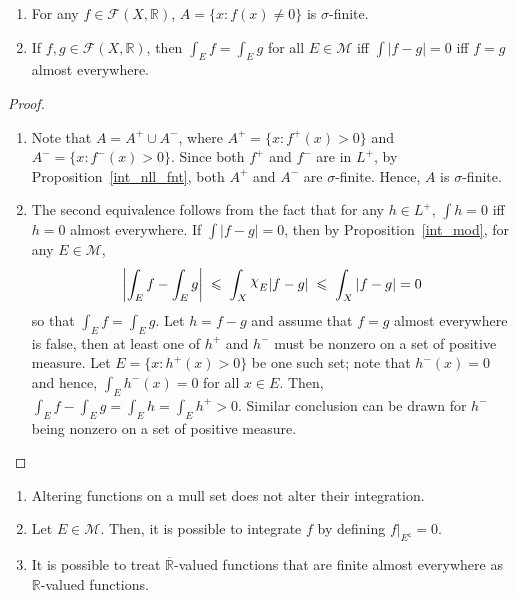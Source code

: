 \documentclass[a4paper,english,12pt]{article}
\newcommand{\goodchi}{\protect\raisebox{2.5pt}{$\chi$}}
\begin{document}
\begin{prop}
\begin{enumerate}[\itshape(a)]
\item For any $f\in \mathcal{F}(X,\mathbb{R})$, $A=\{x:f(x)\neq 0\}$ is $\sigma$-finite.
\item If $f,g\in \mathcal{F}(X,\mathbb{R})$, then $\int_Ef=\int_Eg$ for all $E\in \mathcal{M}$ iff $\int |f-g|=0$ iff $f=g$ almost everywhere.
\end{enumerate}
\end{prop}
\begin{proof}
\begin{enumerate}[\itshape(a)]
\item Note that $A=A^+\cup A^-$, where $A^+=\{x:f^+(x)>0\}$ and $A^-=\{x:f^-(x)>0\}$. Since both $f^+$ and $f^-$ are in $L^+$, by Proposition~\ref{int_nll_fnt}, both $A^+$ and $A^-$ are $\sigma$-finite. Hence, $A$ is $\sigma$-finite.
\item The second equivalence follows from the fact that for any $h\in L^+$, $\int h=0$ iff $h=0$ almost everywhere. If $\int |f-g|=0$, then by Proposition~\ref{int_mod}, for any $E\in \mathcal{M}$,
	\begin{align*}
		\left|\int_Ef-\int_Eg\right|\;\leqslant\;\int_X\goodchi_E|f-g|\;\leqslant\;\int_X|f-g|=0
	\end{align*}
so that $\int_Ef=\int_Eg$. Let $h=f-g$ and assume that $f=g$ almost everywhere is false, then at least one of $h^+$ and $h^-$ must be nonzero on a set of positive measure. Let $E=\{x:h^+(x)>0\}$ be one such set; note that $h^-(x)=0$ and hence, $\int_Eh^-(x)=0$ for all $x\in E$. Then, $\int_Ef-\int_Eg=\int_Eh=\int_Eh^+>0$. Similar conclusion can be drawn for $h^-$ being nonzero on a set of positive measure.
\end{enumerate}
\end{proof}

\begin{rem}
\begin{enumerate}[\itshape(i)]
\item Altering functions on a mull set does not alter their integration.
\item Let $E\in\mathcal{M}$. Then, it is possible to integrate $f$ by defining $f|_{E^{\mathsf{c}}}=0$.
\item It is possible to treat $\overline{\mathbb{R}}$-valued functions that are finite almost everywhere as $\mathbb{R}$-valued functions.
\end{enumerate}
\end{rem}
\end{document}
